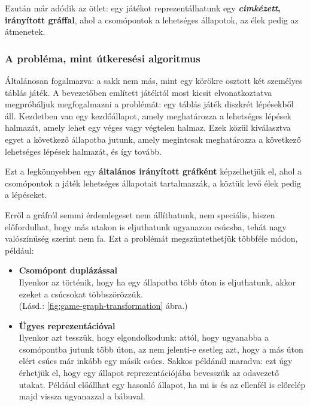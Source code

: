 \documentclass[twoside, a4paper, 12pt]{article}
\begin{document}
Ezután már adódik az ötlet: egy játékot reprezentálhatunk egy \textbf{\textit{cimkézett}, irányított gráffal}, ahol a csomópontok a lehetséges állapotok, az élek pedig az átmenetek.

\subsubsection{A probléma, mint útkeresési algoritmus}
Általánosan fogalmazva: a sakk nem más, mint egy körökre osztott két személyes táblás játék. A bevezetőben említett játéktól most kicsit elvonatkoztatva megpróbáljuk megfogalmazni a problémát: egy táblás játék diszkrét lépésekből áll. Kezdetben van egy kezdőállapot, amely meghatározza a lehetséges lépések halmazát, amely lehet egy véges vagy végtelen halmaz. Ezek közül kiválasztva egyet a következő állapotba jutunk, amely megintcsak meghatározza a következő lehetséges lépések halmazát, és így tovább. 

Ezt a legkönnyebben egy \textbf{általános irányított gráfként} képzelhetjük el, ahol a csomópontok a játék lehetséges állapotait tartalmazzák, a köztük levő élek pedig a lépéseket.

Erről a gráfról semmi érdemlegeset nem állíthatunk, nem speciális, hiszen előfordulhat, hogy más utakon is eljuthatunk ugyanazon csúcsba, tehát nagy valószínűség szerint nem fa. Ezt a problémát megszüntethetjük többféle módon, például: 

\begin{itemize}
	\item \textbf{Csomópont duplázással} \\
	Ilyenkor az történik, hogy ha egy állapotba több úton is eljuthatunk, akkor ezeket a csúcsokat többszörözzük. \\
	(Lásd.: \ref{fig:game-graph-transformation} ábra.)
	
	\item \textbf{Ügyes reprezentációval} \\
	Ilyenkor azt tesszük, hogy elgondolkodunk: attól, hogy ugyanabba a csomópontba jutunk több úton, az nem jelenti-e esetleg azt, hogy a más úton elért csúcs már inkább egy másik csúcs. Sakkos példánál maradva: ezt úgy érhetjük el, hogy egy állapot reprezentációjába bevesszük az odavezető utakat. Például előállhat egy hasonló állapot, ha mi is és az ellenfél is előrelép majd vissza ugyanazzal a bábuval.
\end{itemize}
\end{document}
